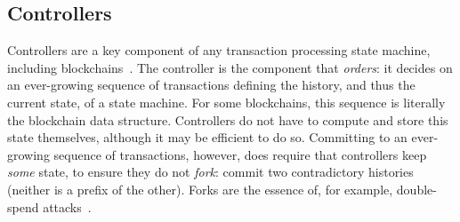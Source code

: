 \documentclass[a4paper,USenglish,cleveref, autoref, thm-restate, anonymous]{lipics-v2021}
\newcommand{\colort}[2]{{\color{#1}{#2}}}
\newcommand{\blue}[1]{\colort{blue}{#1}}
\newcommand{\purple}[1]{{\colort{purple}{#1}}}
\newcommand{\basecoin}{\blue{BaseCoin}}
\newcommand{\basechain}{\blue{BaseChain}}
\newcommand{\sidechain}{\purple{SideChain}}
\begin{document}

\subsection{Controllers}  
Controllers are a key component of any transaction processing state machine, including blockchains~\cite{smr,statemachine}.
The controller is the component that \emph{orders}: it decides on an ever-growing sequence of transactions defining the history, and thus the current state, of a state machine.
For some blockchains, this sequence is literally the blockchain data structure.
Controllers do not have to compute and store this state themselves, although it may be efficient to do so.
Committing to an ever-growing sequence of transactions, however, does require that controllers keep \textit{some} state, to ensure they do not \emph{fork}: commit two contradictory histories (neither is a prefix of the other).
Forks are the essence of, for example, double-spend attacks~\cite{Abraham2017}.
\end{document}
